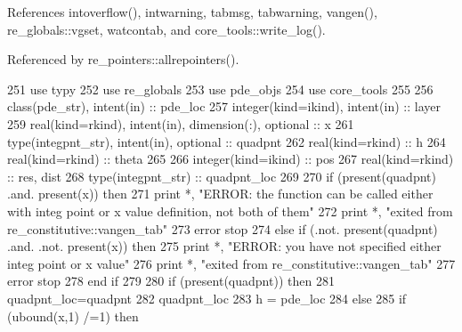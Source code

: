 References intoverflow(), intwarning, tabmsg, tabwarning, vangen(), re\+\_\+globals\+::vgset, watcontab, and core\+\_\+tools\+::write\+\_\+log().



Referenced by re\+\_\+pointers\+::allrepointers().


\begin{DoxyCode}
251       \textcolor{keywordtype}{use }typy
252       \textcolor{keywordtype}{use }re_globals
253       \textcolor{keywordtype}{use }pde_objs
254       \textcolor{keywordtype}{use }core_tools
255       
256       \textcolor{keywordtype}{class}(pde_str), \textcolor{keywordtype}{intent(in)} :: pde\_loc
257       \textcolor{keywordtype}{integer(kind=ikind)}, \textcolor{keywordtype}{intent(in)} :: layer
259       \textcolor{keywordtype}{real(kind=rkind)}, \textcolor{keywordtype}{intent(in)}, \textcolor{keywordtype}{dimension(:)}, \textcolor{keywordtype}{optional} :: x
261       \textcolor{keywordtype}{type}(integpnt_str), \textcolor{keywordtype}{intent(in)}, \textcolor{keywordtype}{optional} :: quadpnt
262       \textcolor{keywordtype}{real(kind=rkind)} :: h
264       \textcolor{keywordtype}{real(kind=rkind)} :: theta
265 
266       \textcolor{keywordtype}{integer(kind=ikind)} :: pos
267       \textcolor{keywordtype}{real(kind=rkind)} :: res, dist
268       \textcolor{keywordtype}{type}(integpnt_str) :: quadpnt\_loc      
269 
270       \textcolor{keywordflow}{if} (\textcolor{keyword}{present}(quadpnt) .and. \textcolor{keyword}{present}(x)) \textcolor{keywordflow}{then}
271         print *, \textcolor{stringliteral}{"ERROR: the function can be called either with integ point or x value definition, not both
       of them"}
272         print *, \textcolor{stringliteral}{"exited from re\_constitutive::vangen\_tab"}
273         error stop
274       \textcolor{keywordflow}{else} \textcolor{keywordflow}{if} (.not. \textcolor{keyword}{present}(quadpnt) .and. .not. \textcolor{keyword}{present}(x)) \textcolor{keywordflow}{then}
275         print *, \textcolor{stringliteral}{"ERROR: you have not specified either integ point or x value"}
276         print *, \textcolor{stringliteral}{"exited from re\_constitutive::vangen\_tab"}
277         error stop
278 \textcolor{keywordflow}{      end if}
279       
280       \textcolor{keywordflow}{if} (\textcolor{keyword}{present}(quadpnt)) \textcolor{keywordflow}{then}
281         quadpnt\_loc=quadpnt
282         quadpnt\_loc%
283         h = pde\_loc%
284       \textcolor{keywordflow}{else}
285         \textcolor{keywordflow}{if} (ubound(x,1) /=1) \textcolor{keywordflow}{then}

\end{DoxyCode}
